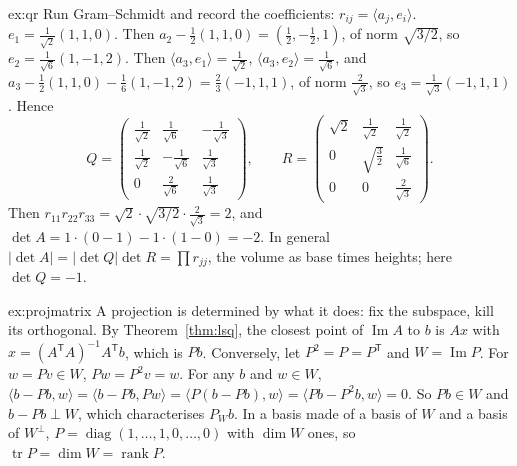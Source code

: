 \begin{solution}{ex:qr}
\idea Run Gram--Schmidt and record the coefficients: $r_{ij}=\langle a_j,e_i\rangle$.
\writeup $e_1=\frac1{\sqrt2}(1,1,0)$. Then $a_2-\frac12(1,1,0)=(\frac12,-\frac12,1)$, of norm $\sqrt{3/2}$, so
$e_2=\frac1{\sqrt6}(1,-1,2)$. Then $\langle a_3,e_1\rangle=\frac1{\sqrt2}$, $\langle a_3,e_2\rangle=\frac1{\sqrt6}$, and
$a_3-\frac12(1,1,0)-\frac16(1,-1,2)=\frac23(-1,1,1)$, of norm $\frac2{\sqrt3}$, so $e_3=\frac1{\sqrt3}(-1,1,1)$. Hence
\[
Q=\begin{pmatrix}\frac1{\sqrt2}&\frac1{\sqrt6}&-\frac1{\sqrt3}\\[2pt]\frac1{\sqrt2}&-\frac1{\sqrt6}&\frac1{\sqrt3}\\[2pt]0&\frac2{\sqrt6}&\frac1{\sqrt3}\end{pmatrix},\qquad
R=\begin{pmatrix}\sqrt2&\frac1{\sqrt2}&\frac1{\sqrt2}\\[2pt]0&\sqrt{\frac32}&\frac1{\sqrt6}\\[2pt]0&0&\frac2{\sqrt3}\end{pmatrix}.
\]
Then $r_{11}r_{22}r_{33}=\sqrt2\cdot\sqrt{3/2}\cdot\frac2{\sqrt3}=2$, and $\det A=1\cdot(0-1)-1\cdot(1-0)=-2$. In general
$|\det A|=|\det Q|\det R=\prod r_{jj}$, the volume as base times heights; here $\det Q=-1$.
\end{solution}

\begin{solution}{ex:projmatrix}
\idea A projection is determined by what it does: fix the subspace, kill its orthogonal.
\writeup By Theorem~\ref{thm:lsq}, the closest point of $\operatorname{Im}A$ to $b$ is $Ax$ with $x=(A^{\mathsf T}A)^{-1}
A^{\mathsf T}b$, which is $Pb$. Conversely, let $P^2=P=P^{\mathsf T}$ and $W=\operatorname{Im}P$. For $w=Pv\in W$,
$Pw=P^2v=w$. For any $b$ and $w\in W$, $\langle b-Pb,w\rangle=\langle b-Pb,Pw\rangle=\langle P(b-Pb),w\rangle=\langle
Pb-P^2b,w\rangle=0$. So $Pb\in W$ and $b-Pb\perp W$, which characterises $P_Wb$. In a basis made of a basis of $W$ and a
basis of $W^\perp$, $P=\operatorname{diag}(1,\dots,1,0,\dots,0)$ with $\dim W$ ones, so $\operatorname{tr}P=\dim W=
\operatorname{rank}P$.
\end{solution}

